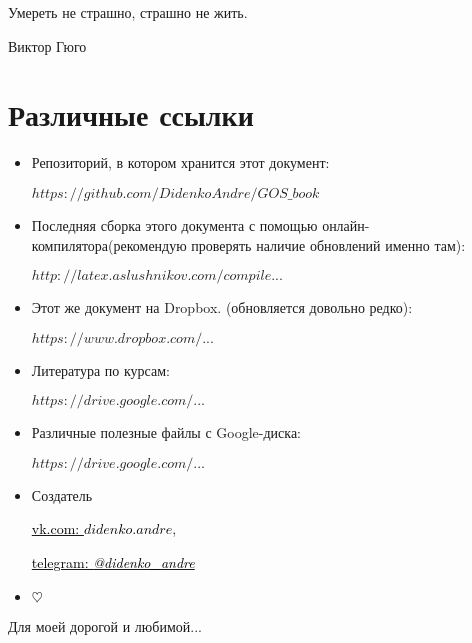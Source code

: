 \epigraph{Умереть не страшно, страшно не жить.}{Виктор Гюго}

{\let\clearpage\relax\chapter{Различные ссылки}}
\begin{itemize}
\item

Репозиторий, в котором хранится этот документ:

\href{https://github.com/DidenkoAndre/GOS_book}{$https://github.com/DidenkoAndre/GOS\_book$}

\item
Последняя сборка этого документа с помощью онлайн-компилятора\newline (рекомендую проверять наличие обновлений именно там): 

\href{http://latex.aslushnikov.com/compile?git=https://github.com/DidenkoAndre/GOS_book&target=_main.tex}{$http://latex.aslushnikov.com/compile...$}

\item

Этот же документ на Dropbox.  \newline (обновляется довольно редко):

\href{https://www.dropbox.com/sh/7e5mfj8q68o2ipp/AAD8XvpZhiJzFbEh_IeH305ia?dl=0&preview=GOSBook.pdf}{$https://www.dropbox.com/...$}

\item
Литература по курсам:

\href{https://drive.google.com/drive/u/0/folders/0BzuzEyNkpwYDcENXcV9jNWdwVlU}{$https://drive.google.com/...$}

\item
Различные полезные файлы с Google-диска:

\href{https://drive.google.com/drive/u/0/folders/0BzuzEyNkpwYDYjVNcE0wa3hqWjA}{$https://drive.google.com/...$}

\item
Создатель

\href{https://vk.com/didenko.andre}{\textcolor{black}{vk.com: \textcolor{Purplemountainmajesty}{$didenko.andre$}}},

\href{https://telegram.me/didenko_andre}{\textcolor{black}{telegram: \textcolor{Purplemountainmajesty}{\textit{@didenko_andre}}}}

\item

$\heartsuit$
\end{itemize}

\newpage
\epigraph{Для моей дорогой и любимой...}{}

